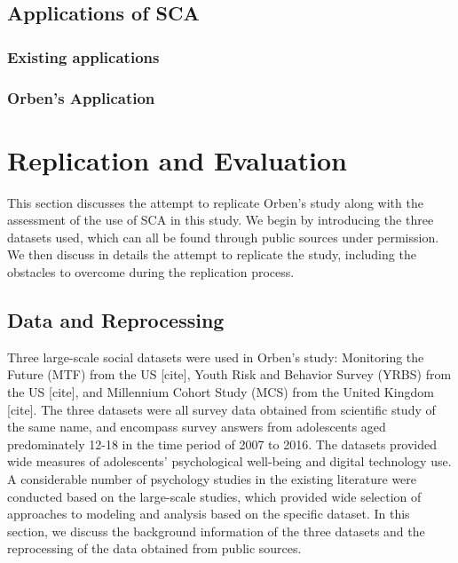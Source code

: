 \documentclass[12pt,twoside]{reedthesis}
\begin{document}
  \section{Applications of SCA}\label{applications-of-sca}
  
  \subsection{Existing applications}\label{existing-applications}
  
  \subsection{Orben's Application}\label{orbens-application}
  
  \chapter{Replication and Evaluation}\label{replication}
  
  This section discusses the attempt to replicate Orben's study along with
  the assessment of the use of SCA in this study. We begin by introducing
  the three datasets used, which can all be found through public sources
  under permission. We then discuss in details the attempt to replicate
  the study, including the obstacles to overcome during the replication
  process.
  
  \section{Data and Reprocessing}\label{data-and-reprocessing}
  
  \par 
  
  Three large-scale social datasets were used in Orben's study: Monitoring
  the Future (MTF) from the US {[}cite{]}, Youth Risk and Behavior Survey
  (YRBS) from the US {[}cite{]}, and Millennium Cohort Study (MCS) from
  the United Kingdom {[}cite{]}. The three datasets were all survey data
  obtained from scientific study of the same name, and encompass survey
  answers from adolescents aged predominately 12-18 in the time period of
  2007 to 2016. The datasets provided wide measures of adolescents'
  psychological well-being and digital technology use. A considerable
  number of psychology studies in the existing literature were conducted
  based on the large-scale studies, which provided wide selection of
  approaches to modeling and analysis based on the specific dataset. In
  this section, we discuss the background information of the three
  datasets and the reprocessing of the data obtained from public sources.
  
\end{document}
